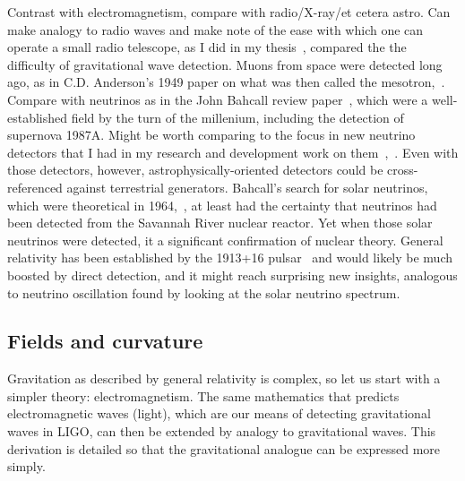             Contrast with electromagnetism, compare with radio/X-ray/et cetera astro. Can make analogy to radio waves and make note of the ease with which one can operate a small radio telescope, as I did in my thesis~\cite{MeadorsThesis2008}, compared the the difficulty of gravitational wave detection. Muons from space were detected long ago, as in C.D. Anderson's 1949 paper on what was then called the mesotron,~\cite{CDAnderson}. Compare with neutrinos as in the John Bahcall review paper~\cite{NeutrinoReview}, which were a well-established field by the turn of the millenium, including the detection of supernova 1987A. Might be worth comparing to the focus in new neutrino detectors that I had in my research and development work on them~\cite{EBubble2005},~\cite{MeadorsNevis2006}. Even with those detectors, however, astrophysically-oriented detectors could be cross-referenced against terrestrial generators. Bahcall's search for solar neutrinos, which were theoretical in 1964,~\cite{NeutrinosSolarTheoretical}, at least had the certainty that neutrinos had been detected from the Savannah River nuclear reactor. Yet when those solar neutrinos were detected, it a significant confirmation of nuclear theory. General relativity has been established by the 1913+16 pulsar~\cite{WeisbergTaylor2004} and would likely be much boosted by direct detection, and it might reach surprising new insights, analogous to neutrino oscillation found by looking at the solar neutrino spectrum.


\subsection{Fields and curvature}
\label{field_curvature_math}

    
    Gravitation as described by general relativity is complex, so let us start with a simpler theory: electromagnetism. 
The same mathematics that predicts electromagnetic waves (light), which are our means of detecting gravitational waves in LIGO, can then be extended by analogy to gravitational waves.
This derivation is detailed so that the gravitational analogue can be expressed more simply.

